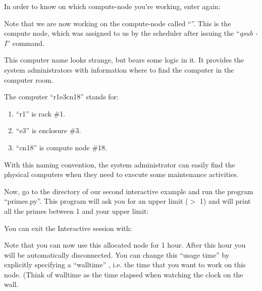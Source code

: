 In order to know on which compute-node you're working, enter again:
\begin{prompt}
\end{prompt}

Note that we are now working on the compute-node called ``\emph{\computenode}''.
This is the compute node, which was assigned to us by the scheduler after
issuing the ``\emph{qsub -I}'' command.

\ifantwerpen
This computer name looks strange, but bears some logic in it.  It provides the
system administrators with information where to find the computer in the
computer room.

The computer ``r1e3cn18'' stands for:

\begin{enumerate}
\item  ``r1'' is rack \#1.
\item  ``e3'' is enclosure \#3.
\item  ``cn18'' is compute node \#18.
\end{enumerate}

With this naming convention, the system administrator can easily find the
physical computers when they need to execute some maintenance activities.
\fi

Now, go to the directory of our second interactive example and run the program
``primes.py''. This program will ask you for an upper limit ($>$ 1) and will
print all the primes between 1 and your upper limit:


You can exit the Interactive session with:
\begin{prompt}
\end{prompt}

Note that you can now use this allocated node for 1 hour.  After this hour you
will be automatically disconnected. You can change this ``usage time'' by
explicitly specifying a ``walltime'' , i.e. the time that you want to work on
this node.  (Think of walltime as the time elapsed when watching the clock on
the wall.

